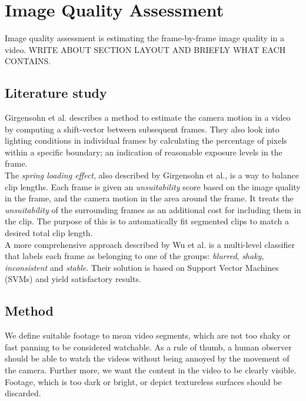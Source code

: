 %
\chapter{Image Quality Assessment}
%
Image quality assessment is estimating the frame-by-frame image quality in a video. WRITE ABOUT SECTION LAYOUT AND BRIEFLY WHAT EACH CONTAINS.%
%
\section{Literature study}
Girgensohn et al.\cite{Girgensohn:2000:SAH:354401.354415} describes a method to estimate the camera motion in a video by computing a shift-vector between subsequent frames. They also look into lighting conditions in individual frames by calculating the percentage of pixels within a specific boundary; an indication of reasonable exposure levels in the frame.\\
The \textit{spring loading effect}\cite{Girgensohn:2000:SAH:354401.354415}, also described by Girgensohn et al., is a way to balance clip lengths. Each frame is given an \textit{unsuitability} score based on the image quality in the frame, and the camera motion in the area around the frame. It treats the \textit{unsuitability} of the surrounding frames as an additional cost for including them in the clip. The purpose of this is to automatically fit segmented clips to match a desired total clip length.\\
%
A more comprehensive approach described by Wu et al.\cite{10.1109/ICME.2005.1521399} is a multi-level classifier that labels each frame as belonging to one of the groups: \textit{blurred}, \textit{shaky}, \textit{inconsistent} and \textit{stable}. Their solution is based on Support Vector Machines (SVMs) and yield satisfactory results.\\ %
%
%
\section{Method}
%
%
We define suitable footage to mean video segments, which are not too shaky or fast panning to be considered watchable. As a rule of thumb, a human observer should be able to watch the videos without being annoyed by the movement of the camera. Further more, we want the content in the video to be clearly visible. Footage, which is too dark or bright, or depict textureless surfaces should be discarded.
%
